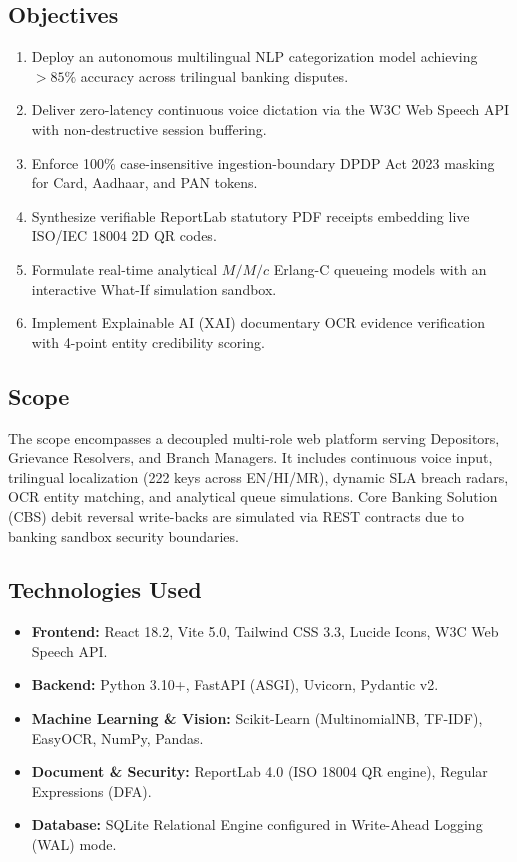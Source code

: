 \documentclass[12pt,singleside,a4paper]{article}
\begin{document}
\subsection{Objectives}
\begin{enumerate}
    \item Deploy an autonomous multilingual NLP categorization model achieving $>85\%$ accuracy across trilingual banking disputes.
    \item Deliver zero-latency continuous voice dictation via the W3C Web Speech API with non-destructive session buffering.
    \item Enforce 100\% case-insensitive ingestion-boundary DPDP Act 2023 masking for Card, Aadhaar, and PAN tokens.
    \item Synthesize verifiable ReportLab statutory PDF receipts embedding live ISO/IEC 18004 2D QR codes.
    \item Formulate real-time analytical $M/M/c$ Erlang-C queueing models with an interactive What-If simulation sandbox.
    \item Implement Explainable AI (XAI) documentary OCR evidence verification with 4-point entity credibility scoring.
\end{enumerate}

\subsection{Scope}
The scope encompasses a decoupled multi-role web platform serving Depositors, Grievance Resolvers, and Branch Managers. It includes continuous voice input, trilingual localization (222 keys across EN/HI/MR), dynamic SLA breach radars, OCR entity matching, and analytical queue simulations. Core Banking Solution (CBS) debit reversal write-backs are simulated via REST contracts due to banking sandbox security boundaries.

\subsection{Technologies Used}
\begin{itemize}
    \item \textbf{Frontend:} React 18.2, Vite 5.0, Tailwind CSS 3.3, Lucide Icons, W3C Web Speech API.
    \item \textbf{Backend:} Python 3.10+, FastAPI (ASGI), Uvicorn, Pydantic v2.
    \item \textbf{Machine Learning \& Vision:} Scikit-Learn (MultinomialNB, TF-IDF), EasyOCR, NumPy, Pandas.
    \item \textbf{Document \& Security:} ReportLab 4.0 (ISO 18004 QR engine), Regular Expressions (DFA).
    \item \textbf{Database:} SQLite Relational Engine configured in Write-Ahead Logging (WAL) mode.
\end{itemize}
\end{document}
